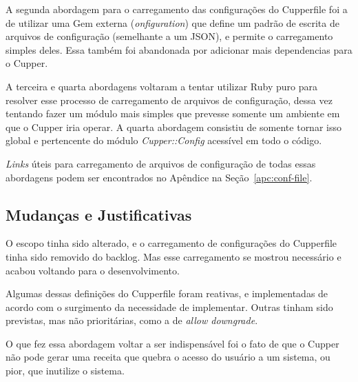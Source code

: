 A segunda abordagem para o carregamento das configurações do Cupperfile foi a de
utilizar uma Gem externa (\textit{onfiguration}) que define um padrão de escrita de 
arquivos de configuração (semelhante a um JSON), e permite o carregamento 
simples deles. Essa também foi abandonada por adicionar mais dependencias para o Cupper.

A terceira e quarta abordagens voltaram a tentar utilizar Ruby puro para resolver
esse processo de carregamento de arquivos de configuração, dessa vez tentando 
fazer um módulo mais simples que prevesse somente um ambiente em que o Cupper
iria operar. A quarta abordagem consistiu de somente tornar isso global e
pertencente do módulo \textit{Cupper::Config} acessível em todo o código.

\textit{Links} úteis para carregamento de arquivos de configuração de todas essas
abordagens podem ser encontrados no Apêndice na Seção~\ref{apc:conf-file}.

\subsection{Mudanças e Justificativas}
O escopo tinha sido alterado, e o carregamento de configurações do Cupperfile
tinha sido removido do backlog. Mas esse carregamento se mostrou necessário
e acabou voltando para o desenvolvimento.

Algumas dessas definições do Cupperfile foram reativas, e implementadas de acordo
com o surgimento da necessidade de implementar. Outras tinham sido previstas, mas
não prioritárias, como a de \textit{allow downgrade}.

O que fez essa abordagem voltar a ser indispensável foi o fato de que o Cupper
não pode gerar uma receita que quebra o acesso do usuário a um sistema, ou pior,
que inutilize o sistema.
